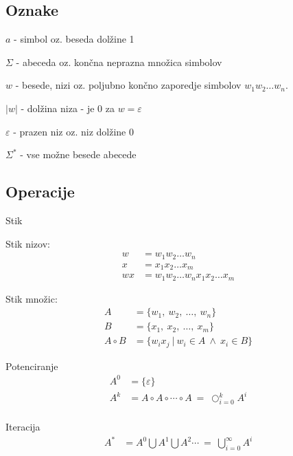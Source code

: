 \documentclass[10pt,a4paper,oneside]{book}
\begin{document}
\subsection*{Oznake}
\begin{items}
\item $a$ - simbol oz. beseda dolžine 1
\item $\Sigma$ - abeceda oz. končna neprazna množica simbolov
\item $w$ - besede, nizi oz. poljubno končno zaporedje  simbolov $w_1w_2 \ldots w_n$. 
\item $|w|$ - dolžina niza - je $0$ za $w = \varepsilon$
\item $\varepsilon$ - prazen niz oz. niz dolžine $0$
\item $\Sigma^*$ - vse možne besede abecede
\end{items}

\subsection*{Operacije}
\begin{items}
\item Stik
	\begin{items}
	\item Stik nizov:
		\begin{align*}
		w  &= w_1 w_2 \ldots w_n\\
		x  &= x_1 x_2 \ldots x_m\\
		wx &= w_1 w_2 \ldots w_n x_1 x_2 \ldots x_m
		\end{align*}
	\item Stik množic:
		\begin{align*} 
		A & = \lbrace w_1 ,\ w_2 ,\ \ldots ,\ w_n \rbrace \\ 
		B & = \lbrace x_1 ,\ x_2 ,\ \ldots ,\ x_m \rbrace \\ 
		A \circ B & = \lbrace w_ix_j \ | \ w_i \in A \ \wedge \ x_i \in B \rbrace
		\end{align*} 
	\end{items}
\item Potenciranje
	\begin{align*} 
	A^0 & = \lbrace \varepsilon \rbrace \\
	A^k & = A \circ A \circ \cdots \circ A \ = \ \bigcirc_{i=0}^{k} A^i \\
	\end{align*}
\item Iteracija
	\begin{align*} 
	A^* &= A^0 \bigcup A^1 \bigcup A^2 \cdots  \ = \ \bigcup_{i=0}^{ \infty } A^i
	\end{align*} 		
\end{items}
\end{document}
